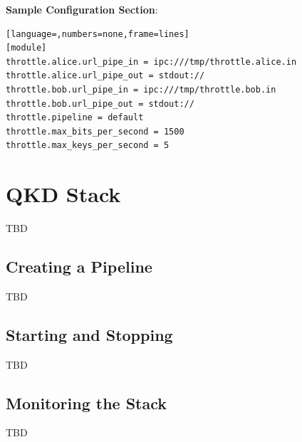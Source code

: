 \bigskip

\noindent \textbf{Sample Configuration Section}: 

\medskip

\begin{lstlisting}[language=,numbers=none,frame=lines]
[module]
throttle.alice.url_pipe_in = ipc:///tmp/throttle.alice.in
throttle.alice.url_pipe_out = stdout://
throttle.bob.url_pipe_in = ipc:///tmp/throttle.bob.in
throttle.bob.url_pipe_out = stdout://
throttle.pipeline = default
throttle.max_bits_per_second = 1500
throttle.max_keys_per_second = 5
\end{lstlisting}

\clearpage


\section{QKD Stack}
\label{sec:QKD Stack}

TBD

\subsection{Creating a Pipeline}
\label{subsec:Creating a Pipeline}

TBD

\subsection{Starting and Stopping}
\label{subsec:Starting and Stopping}

TBD

\subsection{Monitoring the Stack}
\label{subsec:Monitoring the Stack}

TBD

